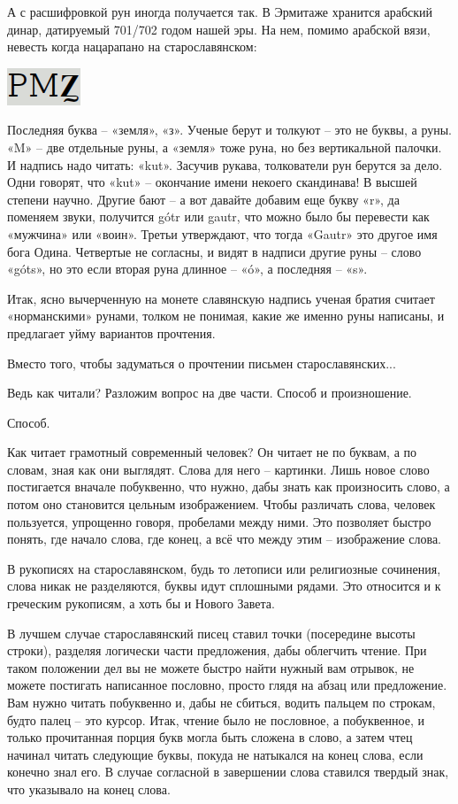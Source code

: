 А с расшифровкой рун иногда получается так. В Эрмитаже хранится арабский динар, датируемый 701/702 годом нашей эры. На нем, помимо арабской вязи, невесть когда нацарапано на старославянском:

\begin{center}
\includegraphics[width=0.20\linewidth]{chast-colebanie-osnov/letyaz/pmz.png}
\end{center} 

Последняя буква – «земля», «з». Ученые берут и толкуют – это не буквы, а руны. «M» – две отдельные руны, а «земля» тоже руна, но без вертикальной палочки. И надпись надо читать: «kut». Засучив рукава, толкователи рун берутся за дело. Одни говорят, что «kut» – окончание имени некоего скандинава! В высшей степени научно. Другие бают – а вот давайте добавим еще букву «r», да поменяем звуки, получится gótr или gautr, что можно было бы перевести как «мужчина» или «воин». Третьи утверждают, что тогда «Gautr» это другое имя бога Одина. Четвертые не согласны, и видят в надписи другие руны – слово «góts», но это если вторая руна длинное – «ó», а последняя – «s».

Итак, ясно вычерченную на монете славянскую надпись ученая братия считает «норманскими» рунами, толком не понимая, какие же именно руны написаны, и предлагает уйму вариантов прочтения.

Вместо того, чтобы задуматься о прочтении письмен старославянских...

Ведь как читали? Разложим вопрос на две части. Способ и произношение.

Способ. 

Как читает грамотный современный человек? Он читает не по буквам, а по словам, зная как они выглядят. Слова для него – картинки. Лишь новое слово постигается вначале побуквенно, что нужно, дабы знать как произносить слово, а потом оно становится цельным изображением. Чтобы различать слова, человек пользуется, упрощенно говоря, пробелами между ними. Это позволяет быстро понять, где начало слова, где конец, а всё что между этим – изображение слова.

В рукописях на старославянском, будь то летописи или религиозные сочинения, слова никак не разделяются, буквы идут сплошными рядами. Это относится и к греческим рукописям, а хоть бы и Нового Завета.

В лучшем случае старославянский писец ставил точки (посередине высоты строки), разделяя логически части предложения, дабы облегчить чтение. При таком положении дел вы не можете быстро найти нужный вам отрывок, не можете постигать написанное пословно, просто глядя на абзац или предложение. Вам нужно читать побуквенно и, дабы не сбиться, водить пальцем  по строкам, будто палец – это курсор. Итак, чтение было не пословное, а побуквенное, и только прочитанная порция букв могла быть сложена в слово, а затем чтец начинал читать следующие буквы, покуда не натыкался на конец слова, если конечно знал его. В случае согласной в завершении слова ставился твердый знак, что указывало на конец слова.

